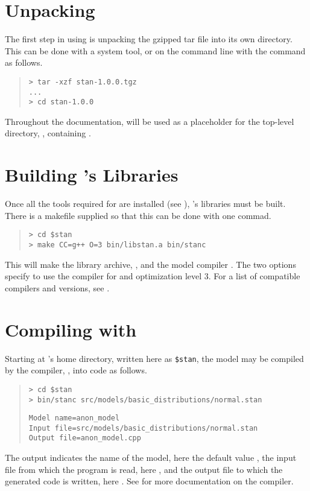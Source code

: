 \section{Unpacking \Stan}

The first step in using \Stan is unpacking the gzipped tar file into
its own directory.  This can be done with a system tool, or on the
command line with the  command as follows.
%
\begin{quote}
\begin{Verbatim}[fontshape=sl]
> tar -xzf stan-1.0.0.tgz
...
> cd stan-1.0.0
\end{Verbatim}
\end{quote}
%
Throughout the documentation,  will be used as a
placeholder for the top-level directory, , containing
\Stan.


\section{Building \Stan's Libraries}

Once all the tools required for \Stan are installed (see
), \Stan's libraries must be built.  There is a
makefile supplied so that this can be done with one commad.
%
\begin{quote}
\begin{Verbatim}[fontshape=sl]
> cd $stan
> make CC=g++ O=3 bin/libstan.a bin/stanc
\end{Verbatim}
\end{quote}
%
This will make the \Stan library archive, , and the
model compiler .  The two options specify to use the
 compiler for \Cpp and optimization level 3.  For a list
of compatible compilers and versions, see .




\section{Compiling  with }

Starting at \Stan's home directory, written here as {\tt \$stan},
the model may be compiled by the \Stan compiler, \stanc, into \Cpp code
as follows.
%
\begin{quote}
\begin{Verbatim}[fontshape=sl]
> cd $stan
> bin/stanc src/models/basic_distributions/normal.stan
\end{Verbatim}
%
\begin{Verbatim}
Model name=anon_model
Input file=src/models/basic_distributions/normal.stan
Output file=anon_model.cpp
\end{Verbatim}
\end{quote}
%
The output indicates the name of the model, here the default value
, the input file from which the \Stan program is
read, here , and the output file to which the
generated \Cpp code is written, here .  See
 for more documentation on the \stanc compiler.

